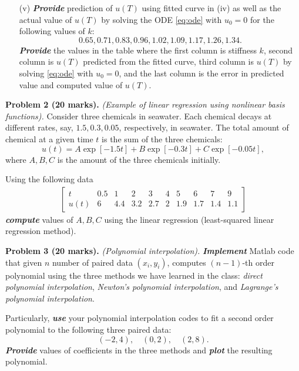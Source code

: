 \documentclass[11pt,a4paper]{article}
\newcommand{\bfit}[1]{\textit{\textbf{#1}}}
\newcommand{\bmatx}[1]{\begin{bmatrix}
    #1
\end{bmatrix}}
\begin{document}
\begin{itemize}
\item[(v)] \bfit{Provide} prediction of $u(T)$ using fitted curve in (iv) as well as the actual value of $u(T)$ by solving the ODE \eqref{eq:ode} with $u_0 = 0$ for the following values of $k$:
\begin{equation*}
0.65, 0.71, 0.83, 0.96, 1.02, 1.09, 1.17, 1.26, 1.34 .
\end{equation*}
\bfit{Provide} the values in the table where the first column is stiffness $k$, second column is $u(T)$ predicted from the fitted curve, third column is $u(T)$ by solving \eqref{eq:ode} with $u_0 = 0$, and the last column is the error in predicted value and computed value of $u(T)$. 
\end{itemize}

\vspace{10pt}
\noindent\textbf{Problem 2 (20 marks).} \textit{(Example of linear regression using nonlinear basis functions).} Consider three chemicals in seawater. Each chemical decays at different rates, say, $1.5, 0.3, 0.05$, respectively, in seawater. The total amount of chemical at a given time $t$ is the sum of the three chemicals:
\begin{equation}
u(t) = A \exp[-1.5t]  + B \exp[-0.3 t] + C \exp[-0.05t],
\end{equation}
where $A, B, C$ is the amount of the three chemicals initially. 

Using the following data
\begin{align*}
\bmatx{t & 0.5 & 1 & 2 & 3 & 4 & 5 & 6 & 7 & 9 \\
u(t) & 6 & 4.4 & 3.2 & 2.7 & 2 & 1.9 & 1.7 & 1.4 & 1.1} 
\end{align*}
\bfit{compute} values of $A, B, C$ using the linear regression (least-squared linear regression method). 

\vspace{10pt}
\noindent\textbf{Problem 3 (20 marks).} \textit{(Polynomial interpolation).} \bfit{Implement} Matlab code that given $n$ number of paired data $(x_i, y_i)$, computes $(n-1)$-th order polynomial using the three methods we have learned in the class: \textit{direct polynomial interpolation}, \textit{Newton's polynomial interpolation}, and \textit{Lagrange's polynomial interpolation}. 

Particularly, \bfit{use} your polynomial interpolation codes to fit a second order polynomial to the following three paired data:
\begin{equation*}
(-2, 4), \quad (0, 2), \quad (2, 8).
\end{equation*}
\bfit{Provide} values of coefficients in the three methods and \bfit{plot} the resulting polynomial. 
\end{document}
